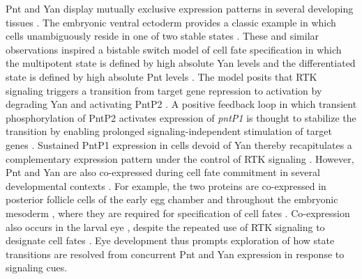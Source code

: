 Pnt and Yan display mutually exclusive expression patterns in several developing tissues \cite{BoisclairLachance2014}. The embryonic ventral ectoderm provides a classic example in which cells unambiguously reside in one of two stable states \cite{Gabay1996,Melen2005}. These and similar observations inspired a bistable switch model of cell fate specification in which the multipotent state is defined by high absolute Yan levels and the differentiated state is defined by high absolute Pnt levels \cite{Graham2010a}. The model posits that RTK signaling triggers a transition from target gene repression to activation by degrading Yan and activating PntP2 \cite{Brunner1994,Rebay1995}. A positive feedback loop in which transient phosphorylation of PntP2 activates expression of \textit{pntP1} is thought to stabilize the transition by enabling prolonged signaling-independent stimulation of target genes \cite{Shwartz2013}. Sustained PntP1 expression in cells devoid of Yan thereby recapitulates a complementary expression pattern under the control of RTK signaling \cite{BoisclairLachance2014}. However, Pnt and Yan are also co-expressed during cell fate commitment in several developmental contexts \cite{BoisclairLachance2014}. For example, the two proteins are co-expressed in posterior follicle cells of the early egg chamber and throughout the embryonic mesoderm \cite{BoisclairLachance2014}, where they are required for specification of cell fates \cite{Morimoto1996,Halfon2000}. Co-expression also occurs in the larval eye \cite{BoisclairLachance2014}, despite the repeated use of RTK signaling to designate cell fates \cite{Freeman1996}. Eye development thus prompts exploration of how state transitions are resolved from concurrent Pnt and Yan expression in response to signaling cues.


